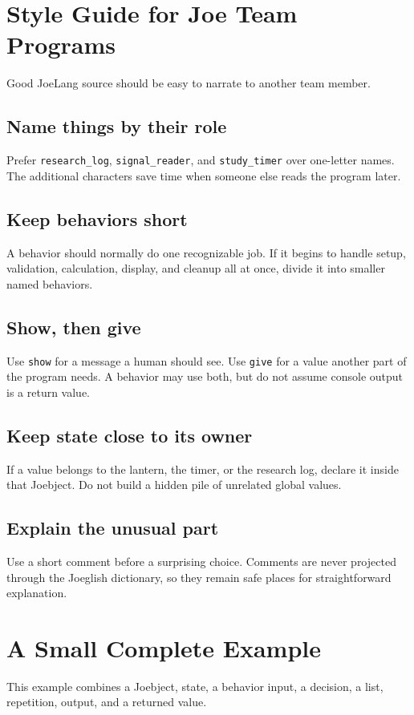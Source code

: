 \documentclass[12pt]{article}
\newcommand{\kw}[1]{\texttt{#1}}
\begin{document}
\clearpage
\section{Style Guide for Joe Team Programs}
Good JoeLang source should be easy to narrate to another team member.

\subsection*{Name things by their role}
Prefer \kw{research\_log}, \kw{signal\_reader}, and \kw{study\_timer} over one-letter names. The additional characters save time when someone else reads the program later.

\subsection*{Keep behaviors short}
A behavior should normally do one recognizable job. If it begins to handle setup, validation, calculation, display, and cleanup all at once, divide it into smaller named behaviors.

\subsection*{Show, then give}
Use \kw{show} for a message a human should see. Use \kw{give} for a value another part of the program needs. A behavior may use both, but do not assume console output is a return value.

\subsection*{Keep state close to its owner}
If a value belongs to the lantern, the timer, or the research log, declare it inside that Joebject. Do not build a hidden pile of unrelated global values.

\subsection*{Explain the unusual part}
Use a short comment before a surprising choice. Comments are never projected through the Joeglish dictionary, so they remain safe places for straightforward explanation.

\clearpage
\section{A Small Complete Example}
This example combines a Joebject, state, a behavior input, a decision, a list, repetition, output, and a returned value.
\end{document}
